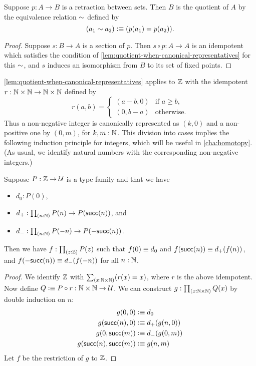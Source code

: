 \begin{cor}\label{thm:retraction-quotient}
  Suppose $p:A\to B$ is a retraction between sets.
  Then $B$ is the quotient of $A$ by the equivalence relation $\sim$ defined by
  \[ (a_1 \sim a_2) \vcentcolon\equiv (p(a_1) = p(a_2)). \]
\end{cor}
\begin{proof}
  Suppose $s:B\to A$ is a section of $p$.
  Then $s\circ p : A\to A$ is an idempotent which satisfies the condition of \autoref{lem:quotient-when-canonical-representatives} for this $\sim$, and $s$ induces an isomorphism from $B$ to its set of fixed points.
\end{proof}

\begin{rmk}\label{Z-quotient-by-canonical-representatives}
\autoref{lem:quotient-when-canonical-representatives} applies to $\mathbb{Z}$ with the idempotent $r : \mathbb{N} \times \mathbb{N} \to \mathbb{N} \times \mathbb{N}$
defined by
%
\begin{equation*}
  r(a, b) =
  \begin{cases}
    (a - b, 0) & \text{if $a \geq b$,} \\
    (0, b - a) & \text{otherwise.}
  \end{cases}  
\end{equation*}
%
Thus a non-negative integer is canonically represented as $(k, 0)$ and a non-positive one by $(0, m)$, for $k,m:\mathbb{N}$.
This division into cases implies the following induction principle for integers, which will be useful in \autoref{cha:homotopy}.
(As usual, we identify natural numbers with the corresponding non-negative integers.)
\end{rmk}

\begin{lem}\label{thm:sign-induction}
  Suppose $P:\mathbb{Z}\to\mathcal{U}$ is a type family and that we have
  \begin{itemize}
  \item $d_0: P(0)$,
  \item $d_+: \prd{n:\N} P(n) \to P(\suc(n))$, and
  \item $d_- : \prd{n:\N} P(-n) \to P(-\suc(n))$.
  \end{itemize}
  Then we have $f:\prd{z:\Z} P(z)$ such that $f(0)\equiv d_0$ and $f(\mathsf{succ}(n))\equiv d_+(f(n))$, and $f(-\mathsf{succ}(n))\equiv d_-(f(-n))$ for all $n:\mathbb{N}$.
\end{lem}
\begin{proof}
  We identify $\mathbb{Z}$ with $\sm{x:\N\times\N}(r(x)=x)$, where $r$ is the above idempotent.
  Now define $Q\vcentcolon\equiv P\circ r:\mathbb{N}\times \mathbb{N} \to \mathcal{U}$.
  We can construct $g:\prd{x:\N\times \N} Q(x)$ by double induction on $n$:
  \begin{align*}
    g(0,0) &\vcentcolon\equiv d_0\\
    g(\mathsf{succ}(n),0) &\vcentcolon\equiv d_+(g(n,0))\\
    g(0,\mathsf{succ}(m)) &\vcentcolon\equiv d_-(g(0,m))\\
    g(\mathsf{succ}(n),\mathsf{succ}(m)) &\vcentcolon\equiv g(n,m)
  \end{align*}
  Let $f$ be the restriction of $g$ to $\mathbb{Z}$.
\end{proof}

